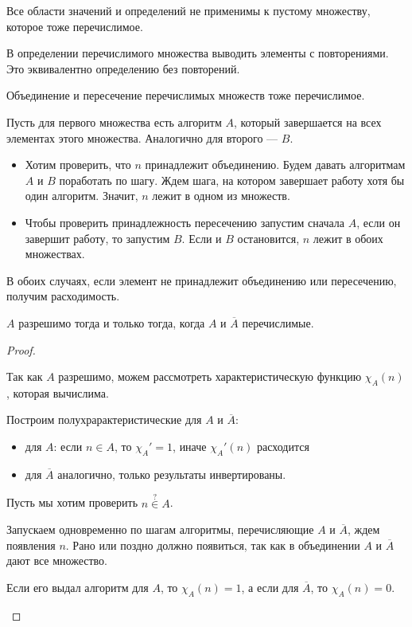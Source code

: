 \begin{note}
    Все области значений и определений не применимы к пустому множеству, которое тоже перечислимое.
\end{note}

\begin{probl}
    В определении перечислимого множества выводить элементы с повторениями. Это эквивалентно определению без повторений. 
\end{probl}

\begin{thm}
    Объединение и пересечение перечислимых множеств тоже перечислимое.
\end{thm}
\begin{proof*}
    Пусть для первого множества есть алгоритм $ A$, который завершается на всех элементах этого множества. Аналогично для второго --- $ B$.

    \begin{itemize}
	\item Хотим проверить, что $ n$ принадлежит объединению. Будем давать алгоритмам  $ A$ и $ B$ поработать по шагу. Ждем шага, на котором завершает работу хотя бы один алгоритм. Значит, $ n$ лежит в одном из множеств. 
	\item Чтобы проверить принадлежность пересечению запустим сначала $ A$, если он завершит работу, то запустим $ B$. Если и $ B$ остановится, $ n $ лежит в обоих множествах.
    \end{itemize}
    В обоих случаях, если элемент не принадлежит объединению или пересечению, получим расходимость.
\end{proof*}


\begin{thm}[Пост]
    $ A$ разрешимо тогда и только тогда, когда $ A$ и $ \overline{A}$ перечислимые.
\end{thm}
\begin{proof}
    ~ \begin{description}
        \item {} 
			Так как $ A $ разрешимо, можем рассмотреть характеристическую функцию $ \chi_{A}(n)$, которая вычислима.

			Построим полухрарактеристические для $ A$ и $ \overline{A}$:
			\begin{itemize}
			\item для $ A$: если $ n \in A$, то $ \chi_{A}' = 1$, иначе $ \chi_{A}'(n)$ расходится
			\item для $ \overline{A}$ аналогично, только результаты инвертированы.
			\end{itemize}
        \item {} 
	    Пусть мы хотим проверить $ n \stackrel{?}{\in} A$.

	    Запускаем одновременно по шагам алгоритмы, перечисляющие $ A$ и $ \overline{A}$, ждем появления $ n$. 
	    Рано или поздно должно появиться, так как в объединении $ A$ и $\overline{A}$ дают все множество. 
	    
	    Если его выдал алгоритм для $ A$, то $ \chi_A(n) = 1$, а если для $\overline{A}$, то $ \chi_A(n) = 0$.
    \end{description} 
\end{proof}


